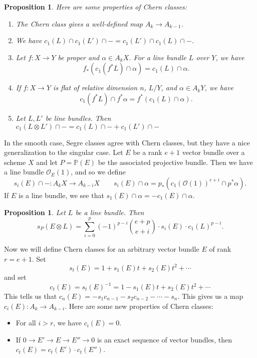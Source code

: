 \documentclass[leqno, openany]{memoir}
\newtheorem{prop}[thm]{Proposition}
\theoremstyle{definition}
\theoremstyle{remark}
\theoremstyle{plain}
\theoremstyle{definition}
\theoremstyle{remark}
\renewcommand{\P}{\mathbb{P}}
\newcommand{\mc}[1]{\mathcal{#1}}
\begin{document}
\begin{prop}
    Here are some properties of Chern classes:
    \begin{enumerate}
        \item The Chern class gives a well-defined map $A_k \to A_{k-1}$.
        \item We have $c_1(L) \cap c_1(L') \cap - = c_1(L') \cap c_1(L) \cap -$.
        \item Let $f \colon X \to Y$ be proper and $\alpha \in A_k X$. For a line bundle $L$ over $Y$, we have
            \[ f_* (c_1(f^* L) \cap \alpha) = c_1(L) \cap \alpha. \]
        \item If $f \colon X \to Y$ is flat of relative dimension $n$, $L/Y$, and $\alpha \in A_k Y$, we have
            \[ c_1(f^* L) \cap f^* \alpha = f^*(c_1(L) \cap \alpha). \]
        \item Let $L, L'$ be line bundles. Then $c_1(L \otimes L') \cap - = c_1(L) \cap - + c_1(L') \cap -$
    \end{enumerate}
\end{prop}

In the smooth case, Segre classes agree with Chern classes, but they have a nice generalization to the singular case. Let $E$ be a rank $e+1$ vector bundle over a scheme $X$ and let $P = \P(E)$ be the associated projective bundle. Then we have a line bundle $\mc{O}_E(1)$, and so we define
\[ s_i(E) \cap - \colon A_k X \to A_{k-i} X \qquad s_i(E) \cap \alpha = p_* (c_1 { (\mc{O}(1)) }^{e+i} \cap p^* \alpha ). \]
If $E$ is a line bundle, we see that $s_1(E) \cap \alpha = - c_1(E) \cap \alpha$. 

\begin{prop}
    Let $L$ be a line bundle. Then 
    \[ s_P(E \otimes L) = \sum_{i=0}^p {(-1)}^{p-i} \binom{e+p}{e+i} \cdot s_i(E) \cdot {c_1(L)}^{p-i}. \]
\end{prop}

Now we will define Chern classes for an arbitrary vector bundle $E$ of rank $r = e+1$. Set
\[ s_t(E) = 1 + s_1(E) t + s_2(E) t^2 + \cdots \]
and set 
\[ c_t(E) = { s_t(E) }^{-1} = 1 - s_1(E) t + s_2(E) t^2 + \cdots \]
This tells us that $c_n(E) = - s_1 c_{n-1} - s_2 c_{n-2} - \cdots - s_n$. This gives us a map $c_i(E) \colon A_k \to A_{k-i}$. Here are some new properties of Chern classes:
\begin{itemize}
    \item For all $i > r$, we have $c_i(E) = 0$.
    \item If $0 \to E' \to E \to E'' \to 0$ is an exact sequence of vector bundles, then $c_t(E) = c_t(E') \cdot c_t(E'')$.
\end{itemize}
\end{document}
